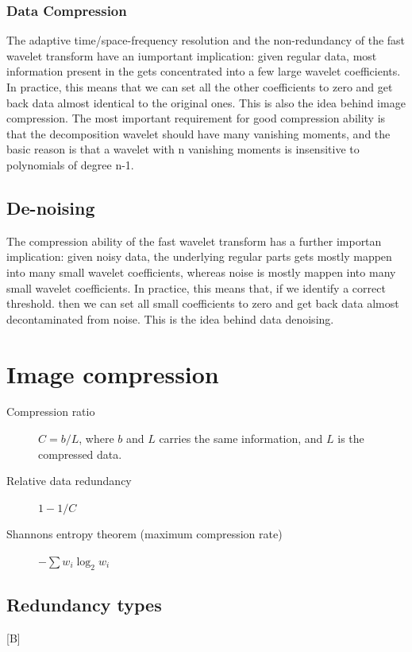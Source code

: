 \documentclass[12pt]{article}
\begin{document}
	    \subsubsection{Data Compression}
	    The adaptive time/space-frequency resolution and the non-redundancy of the fast wavelet transform have an iumportant implication: 
	    given regular data, most information present in the gets concentrated into a few large
	    wavelet coefficients. In practice, this means that we can set all the
	    other coefficients to zero and get back data almost identical to the
	    original ones. This is also the idea behind image compression. The most
	    important requirement for good compression ability is that the
	    decomposition wavelet should have many vanishing moments, and the basic
	    reason is that a wavelet with n vanishing moments is insensitive to
	    polynomials of degree n-1. 
	    
	    \subsection{De-noising}
	    The compression ability of the fast wavelet transform has a further
	    importan implication: given noisy data, the underlying regular parts gets
	    mostly mappen into many small wavelet coefficients, whereas noise is
	    mostly mappen into many small wavelet coefficients. In practice, this
	    means that, if we identify a correct threshold. then we can set all small
	    coefficients to zero and get back data almost decontaminated from noise.
	    This is the idea behind data denoising.
%	
%
\section{Image compression}
	\begin{description}
	    \item[Compression ratio] $C = b/L$, where $b$ and $L$ carries the same information, and
	    $L$ is the compressed data.
	    \item[Relative data redundancy] $1 - 1/C$
	    \item[Shannons entropy theorem (maximum compression rate)] $-\sum w_i \log_2 w_i$
    \end{description}
    \subsection{Redundancy types}
    [B]
\end{document}
